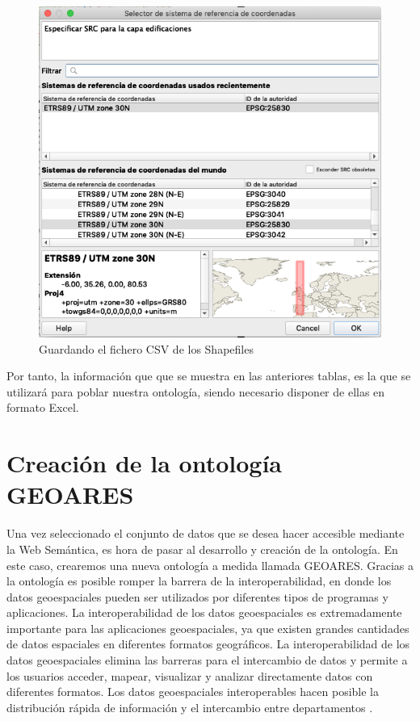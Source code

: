 \begin{figure}[H]
	\centering
	\includegraphics[width=0.68\linewidth]{imagenes/capitulo5/guardar}
	\caption{Guardando el fichero CSV de los Shapefiles}
	\label{fig:guardar}
\end{figure}





Por tanto, la información que que se muestra en las anteriores tablas, es la que se utilizará para poblar nuestra ontología, siendo necesario disponer de ellas en formato Excel.




\section{Creación de la ontología GEOARES}

\label{ch:crear}

Una vez seleccionado el conjunto de datos que se desea hacer accesible mediante la Web Semántica, es hora de pasar al desarrollo y creación de la ontología. En este caso, crearemos una nueva ontología a medida llamada  GEOARES. Gracias a la ontología es posible romper la barrera de la interoperabilidad, en donde los datos geoespaciales pueden ser utilizados por diferentes tipos de programas y aplicaciones. La interoperabilidad de los datos geoespaciales es extremadamente importante para las aplicaciones geoespaciales, ya que existen grandes cantidades de datos espaciales en diferentes formatos geográficos. La interoperabilidad de los datos geoespaciales elimina las barreras para el intercambio de datos y permite a los usuarios acceder, mapear, visualizar y analizar directamente datos con diferentes formatos. Los datos geoespaciales interoperables hacen posible la distribución rápida de información y el intercambio entre departamentos \cite{libro-gis}.\\

